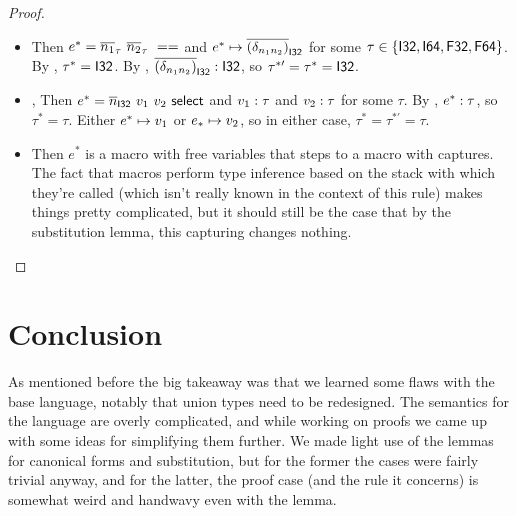 \documentclass[acmsmall, review]{acmart}
\theoremstyle{definition}
\begin{document}
\begin{proof}
\begin{itemize}
    \item {}
        Then $e^* = \overline{n_1}_\tau~ \overline{n_2}_\tau~ ==$ and $e^* \mapsto \overline{(\delta_{n_1 n_2})}_{\mathsf{I32}}$ for some $\tau \in \{\mathsf{I32}, \mathsf{I64}, \mathsf{F32}, \mathsf{F64}\}$.
        By , $\tau^* = \mathsf{I32}$.
        By , $\overline{(\delta_{n_1 n_2})}_{\mathsf{I32}} : \mathsf{I32}$, so $\tau^{*\prime} = \tau^* = \mathsf{I32}$.
    
    \item {}, 
        Then $e^* = \overline{n}_{\mathsf{I32}} ~ v_1 ~ v_2 ~ \mathsf{select}$ and $v_1 : \tau$ and $v_2 : \tau$ for some $\tau$.
        By , $e^* : \tau$, so $\tau^* = \tau$.
        Either $e^* \mapsto v_1$ or $e_* \mapsto v_2$, so in either case, $\tau^* = \tau^{*\prime} = \tau$.

    \item {}
        Then $e^*$ is a macro with free variables that steps to a macro with captures.
        The fact that macros perform type inference based on the stack with which they're called (which isn't really known in the context of this rule) makes things pretty complicated, but it should still be the case that by the substitution lemma, this capturing changes nothing.
\end{itemize}

\end{proof}

\section{Conclusion}
As mentioned before the big takeaway was that we learned some flaws with the base language, notably that union types need to be redesigned.
The semantics for the language are overly complicated, and while working on proofs we came up with some ideas for simplifying them further.
We made light use of the lemmas for canonical forms and substitution, but for the former the cases were fairly trivial anyway, and for the latter, the proof case (and the rule it concerns) is somewhat weird and handwavy even with the lemma.

%
\end{document}
